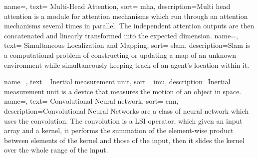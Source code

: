 \renewcommand{\acronymname}{Acronimi e abbreviazioni}

{
    name=,
    text= Multi-Head Attention,
    sort= mha,
    description={Multi head attention is a module for attention mechanisms which run through an attention mechanisms several times in parallel. The independent attention outputs are then concatenated and linearly transformed into the expected dimension.}
}
{
    name=,
    text= Simultaneous Localization and Mapping,
    sort= slam,
    description={Slam is a computational problem of constructing or updating a map of an unknown environment while simultaneously keeping track of an agent's location within it.}
}

{
    name=,
    text= Inertial measurement unit,
    sort= imu,
    description={Inertial measurement unit is a device that measures the motion of an object in space.}
}
{
    name=,
    text= Convolutional Neural network,
    sort= cnn,
    description={Convolutional Neural Networks are a class of neural network which uses the convolution.
    The convolution is a LSI operator, which given an input array and a kernel, it performs the summation of the element-wise product between elements of the kernel and those of the input, then it slides the kernel over the whole range of the input. }
}

